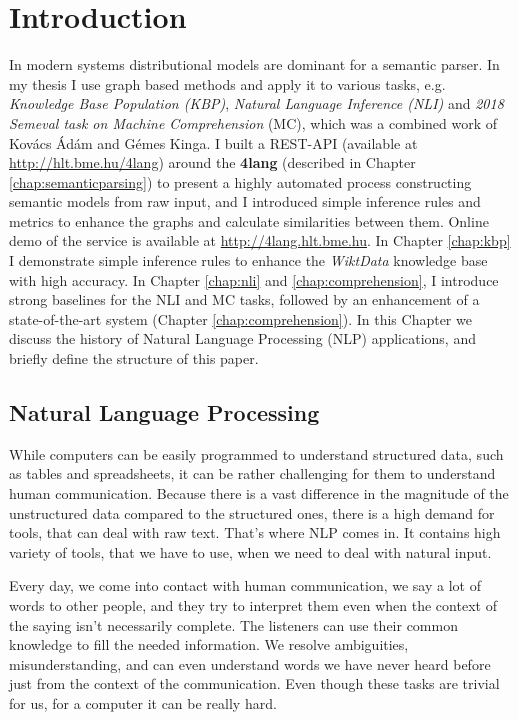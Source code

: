 \chapter{Introduction}
\label{chap:Introdu}
In modern systems distributional models are dominant for a semantic parser. In my thesis I use graph based methods and 
apply it to various tasks, e.g. \textit{Knowledge Base Population (KBP)}, \textit{Natural Language Inference (NLI)} and \textit{2018 Semeval task on Machine Comprehension} (MC), which was a combined work of Kov\'acs \'Ad\'am and G\'emes Kinga.
I built a REST-API (available at \url{http://hlt.bme.hu/4lang}) 
around the \textbf{4lang}\cite{Recski:2016} (described in Chapter \ref{chap:semanticparsing}) 
to present a highly automated process constructing semantic models from raw input, and I introduced simple inference rules and metrics to enhance the graphs and calculate similarities between them.
Online demo of the service is available at \url{http://4lang.hlt.bme.hu}. 
In Chapter \ref{chap:kbp} I demonstrate simple inference rules to enhance the \textit{WiktData} knowledge base with high accuracy.  
In Chapter \ref{chap:nli} and \ref{chap:comprehension}, I introduce strong baselines for the NLI and MC tasks, 
followed by an enhancement of a state-of-the-art system \cite{Wang:2018} (Chapter \ref{chap:comprehension}). 
In this Chapter we discuss the history of Natural Language Processing (NLP) applications, 
and briefly define the structure of this paper.
\section{Natural Language Processing}
While computers can be easily programmed to understand structured data, such as tables and spreadsheets, it can be rather challenging for them
to understand human communication. Because there is a vast difference in the magnitude of the unstructured data compared to the structured ones, there is a high demand
for tools, that can deal with raw text. That's where NLP comes in. It contains high variety of tools, that we have to use, when we need to deal with natural input.

Every day, we come into contact with human communication, we say a lot of words to other people, and they try to interpret them even when the context of the saying 
isn't necessarily complete. The listeners can use their common knowledge to fill the needed information. We resolve ambiguities, misunderstanding, and can even understand words 
we have never heard before just from the context of the communication.
Even though these tasks are trivial for us, for a computer it can be really hard.

